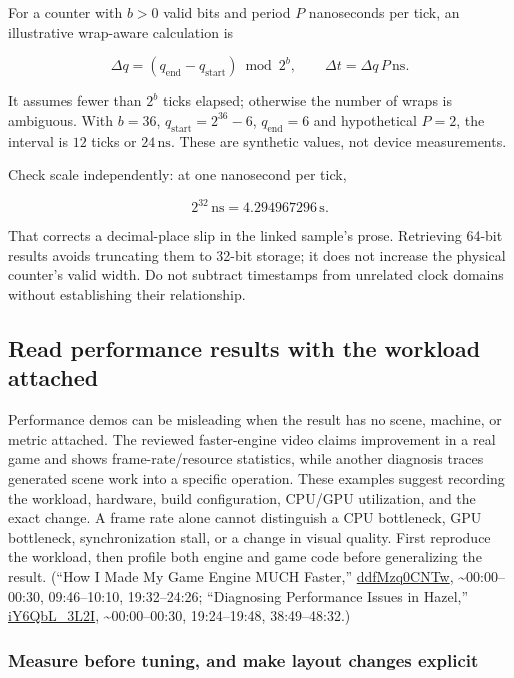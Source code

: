 For a counter with \(b>0\) valid bits and period \(P\) nanoseconds per tick, an illustrative wrap-aware calculation is

\[
\Delta q=(q_{\mathrm{end}}-q_{\mathrm{start}})\bmod2^b,
\qquad
\Delta t=\Delta q\,P\,\mathrm{ns}.
\]

It assumes fewer than \(2^b\) ticks elapsed; otherwise the number of wraps is ambiguous. With \(b=36\), \(q_{\mathrm{start}}=2^{36}-6\), \(q_{\mathrm{end}}=6\) and hypothetical \(P=2\), the interval is \(12\) ticks or \(24\,\mathrm{ns}\). These are synthetic values, not device measurements.

Check scale independently: at one nanosecond per tick,

\[2^{32}\,\mathrm{ns}=4.294967296\,\mathrm{s}.\]

That corrects a decimal-place slip in the linked sample's prose. Retrieving 64-bit results avoids truncating them to 32-bit storage; it does not increase the physical counter's valid width. Do not subtract timestamps from unrelated clock domains without establishing their relationship.

\subsection{Read performance results with the workload attached}\label{06-engine-ii-ch041-read-performance-results-with-the-workload-attached}

Performance demos can be misleading when the result has no scene, machine, or metric attached. The reviewed faster-engine video claims improvement in a real game and shows frame-rate/resource statistics, while another diagnosis traces generated scene work into a specific operation. These examples suggest recording the workload, hardware, build configuration, CPU/GPU utilization, and the exact change. A frame rate alone cannot distinguish a CPU bottleneck, GPU bottleneck, synchronization stall, or a change in visual quality. First reproduce the workload, then profile both engine and game code before generalizing the result. (``How I Made My Game Engine MUCH Faster,'' \href{https://www.youtube.com/watch?v=ddfMzq0CNTw}{ddfMzq0CNTw}, \textasciitilde00:00--00:30, 09:46--10:10, 19:32--24:26; ``Diagnosing Performance Issues in Hazel,'' \href{https://www.youtube.com/watch?v=iY6QbL_3L2I}{iY6QbL\_3L2I}, \textasciitilde00:00--00:30, 19:24--19:48, 38:49--48:32.)

\subsubsection{Measure before tuning, and make layout changes explicit}\label{06-engine-ii-ch041-measure-before-tuning-and-make-layout-changes-explicit}

